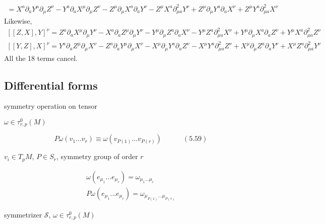 \documentclass[twoside]{amsart}
\begin{document}
\begin{enumerate}
\[\begin{gathered}
  = X^a \partial_a Y^{\mu} \partial_{\mu} Z^{\nu} - Y^a \partial_a X^{\mu} \partial_{\mu} Z^{\nu} - Z^{\mu} \partial_{\mu} X^a \partial_a Y^{\nu} -Z^{\mu}X^a \partial^2_{\mu a} Y^{\nu} + Z^{\mu} \partial_{\mu} Y^a \partial_a X^{\nu} + Z^{\mu} Y^a \partial^2_{\mu a} X^{\nu} 
\end{gathered}
\]
Likewise,
\[
\begin{gathered}
    [[Z,X],Y]^{\nu}    = Z^a \partial_a X^{\mu} \partial_{\mu} Y^{\nu} - X^a \partial_a Z^{\mu} \partial_{\mu} Y^{\nu} - Y^{\mu} \partial_{\mu} Z^a \partial_a X^{\nu} - Y^{\mu} Z^a \partial^2_{\mu a} X^{\nu} + Y^{\mu} \partial_{\mu} X^a \partial_a Z^{\nu} + Y^{\mu} X^a \partial^2_{\mu a} Z^{\nu} \\
    [[Y,Z],X]^{\nu}    = Y^a \partial_a Z^{\mu} \partial_{\mu} X^{\nu} - Z^a \partial_a Y^{\mu} \partial_{\mu} X^{\nu} - X^{\mu} \partial_{\mu} Y^a \partial_a Z^{\nu} - X^{\mu} Y^a \partial^2_{\mu a} Z^{\nu} + X^{\mu} \partial_{\mu} Z^a \partial_a Y^{\nu} + X^{\mu} Z^a \partial^2_{\mu a} Y^{\nu} 
\end{gathered}
\]
All the 18 terms cancel.  

\end{enumerate}






\subsection{ Differential forms }

symmetry operation on tensor \quad 

$\omega \in \tau^0_{r,p}(M)$

\begin{equation}
P \omega(v_1 \dots v_r) \equiv \omega(v_{P(1)} \dots v_{P(r)} ) \quad \quad \quad (5.59)
\end{equation}

$v_i \in T_p M$, $P \in S_r$, symmetry group of order $r$

\[
\begin{gathered}
  \omega(e_{\mu_1} \dots e_{\mu_r} ) = \omega_{\mu_1 \dots \mu_r} \\
  P\omega(e_{\mu_1} \dots e_{\mu_r} ) = \omega_{ \mu_{P(1)} \dots \mu_{ P(r)}  }
\end{gathered}
\]

symmetrizer $\mathcal{S}$, $\omega \in \tau_{r,p}^0(M)$
\end{document}
